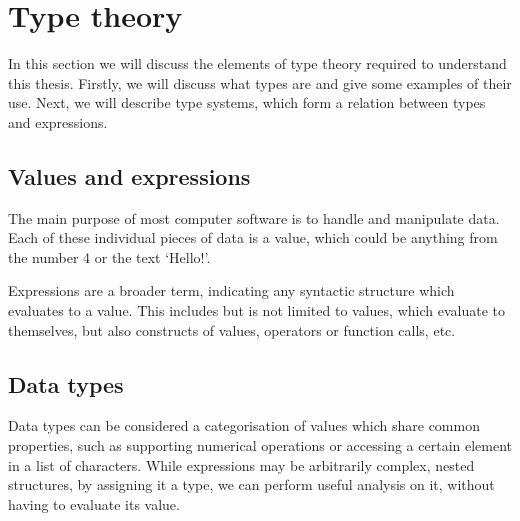 \documentclass[nofilelist]{cslthse-msc}
\newcommand{\CR}[1]{\textcolor{green!60!black}{[\textbf{CR}:#1]}}
\newcommand{\reviewquestion}[1]{\textcolor{red!80!black}{[\textbf{Review question}:#1]}}
\begin{document}

\section{Type theory}\label{typetheory}
In this section we will discuss the elements of type theory required to understand this thesis.
Firstly, we will discuss what types are and give some examples of their use.
Next, we will describe type systems, which form a relation between types and expressions.

\subsection{Values and expressions}
The main purpose of most computer software is to handle and manipulate data.
Each of these individual pieces of data is a value, which could be anything from the number 4 or the text `Hello!'.

Expressions are a broader term, indicating any syntactic structure which evaluates to a value.
This includes but is not limited to values, which evaluate to themselves, but also constructs of values, operators or function calls, etc.

\subsection{Data types}
Data types can be considered a categorisation of values which share common properties, such as supporting numerical operations or accessing a certain element in a list of characters.
While expressions may be arbitrarily complex, nested structures, by assigning it a type, we can perform useful analysis on it, without having to evaluate its value.
\end{document}
